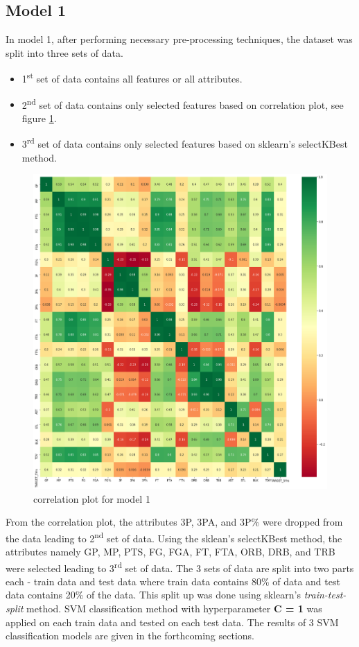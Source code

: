 \documentclass[format=sigconf]{acmart}
\begin{document}
\subsection{Model 1}
In model 1, after performing necessary pre-processing techniques, the dataset was split into three sets of data.
\begin{itemize}
    \item 1\textsuperscript{st} set of data contains all features or all attributes.
    \item 2\textsuperscript{nd} set of data contains only selected features based on correlation plot, see figure \ref{fig:corplot1}.
    \item 3\textsuperscript{rd} set of data contains only selected features based on sklearn's selectKBest method.
\end{itemize}
\begin{figure}[H]
    \centering
    \includegraphics[scale=0.20]{correlation_plot_1.png}
    \caption{correlation plot for model 1}
    \label{fig:corplot1}
\end{figure}

From the correlation plot, the attributes 3P, 3PA, and 3P\% were dropped from the data leading to 2\textsuperscript{nd} set of data. 
Using the sklean's selectKBest method, the attributes namely GP, MP, PTS, FG, FGA, FT, FTA, ORB, DRB, and TRB were selected leading
to 3\textsuperscript{rd} set of data.
The 3 sets of data are split into two parts each - train data and test data where train data contains 80\% of data and test data contains
20\% of the data. This split up was done using sklearn's \textit{train-test-split} method. SVM classification method 
with hyperparameter \textbf{C = 1} was applied on each train data and tested on each test data. The results of 3 SVM classification 
models are given in the forthcoming sections.
\end{document}
